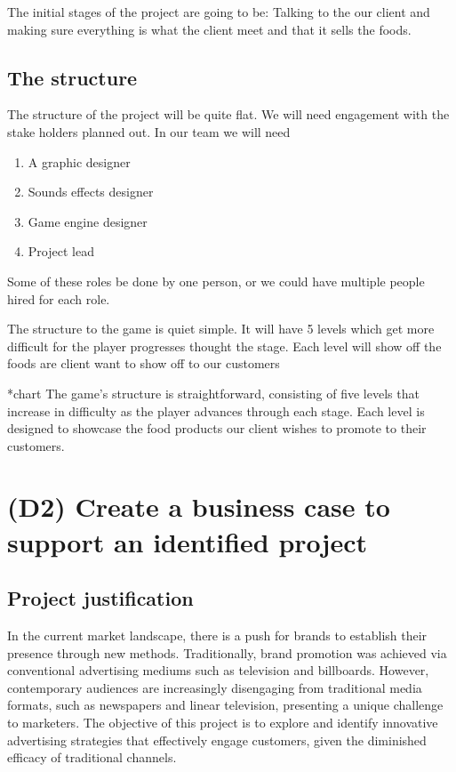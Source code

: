 \documentclass{article}
\begin{document}
The initial stages of the project are going to be:
Talking to the our client and making sure everything is what the client meet and that it sells the foods.

\subsection{The structure}
The structure of the project will be quite flat. We will need engagement with the stake holders planned out.
In our team we will need
\begin{enumerate}
    \item A graphic designer
    \item Sounds effects designer
    \item Game engine designer
    \item Project lead
\end{enumerate}
Some of these roles be done by one person, or we could have multiple people hired for each role.

The structure to the game is quiet simple. It will have 5 levels which get more difficult for the player progresses thought the stage. Each level will show off the foods are client want to show off to our customers 

*chart
The game's structure is straightforward, consisting of five levels that increase in difficulty as the player advances through each stage. Each level is designed to showcase the food products our client wishes to promote to their customers.





\break
\section{(D2) Create a business case to support an identified project}

\subsection{Project justification}
In the current market landscape, there is a push for brands to establish their presence through new methods. Traditionally, brand promotion was achieved via conventional advertising mediums such as television and billboards. However, contemporary audiences are increasingly disengaging from traditional media formats, such as newspapers and linear television, presenting a unique challenge to marketers. The objective of this project is to explore and identify innovative advertising strategies that effectively engage customers, given the diminished efficacy of traditional channels.
\end{document}
